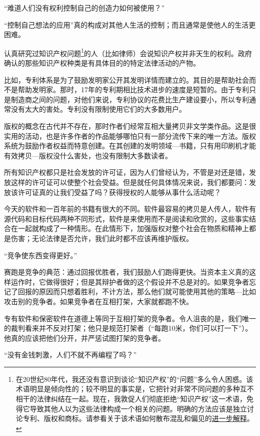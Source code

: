 “难道人们没有权利控制自己的创造力如何被使用？”\par
“控制自己想法的应用”真的构成对其他人生活的控制；而且通常是使他人的生活更困难。\par
认真研究过知识产权问题\footnote{在20世纪80年代，我还没有意识到谈论“知识产权”的“问题”多么令人困惑。该术语明显是倾向性的；较不明显的事实是，它把针对非常不同问题的多种互不相干的法律纠结在一起。现在，我敦促人们彻底拒绝“知识产权”这一术语，免得它导致其他人以为这些法律构成一个相关的问题。明确的方法应该是独立讨论专利、版权和商标。请参看关于该术语如何散布混乱和偏见的\href{http://www.gnu.org/philosophy/not-ipr.html}{进一步解释}。}的人（比如律师）会说知识产权并非天生的权利。政府确认的那些知识产权种类是有具体目的的特定法律活动的产物。\par
比如，专利体系是为了鼓励发明家公开其发明详情而建立的。其目的是帮助社会而不是帮助发明家。那时，17年的专利期相比技术进步的速度是短暂的。由于专利只是制造商之间的问题，对他们来说，专利协议的花费比生产建设要小，所以专利通常没有太大的害处。专利没有限制使用它们的大多数用户。\par
版权的概念在古代并不存在，那时作者们经常互相大量拷贝非文学类作品。这是很实用的活动，也是许多作者的作品能够哪怕只有一部分流传下来的唯一方法。版权系统为鼓励作者权益而特意创建。在其创建的发明领域—书籍，只有用印刷机才能有效拷贝—版权没什么害处，也没有限制大多数读者。\par
所有知识产权都只是社会发放的许可证，因为人们曾经认为，不管是对还是错，发放这样的许可证可以使整个社会受益。但是就任何具体情况来说，我们都要问：发放该许可证真的让我们受益了吗？获得授权的人能够从事什么活动呢？\par
今天的软件和一百年前的书籍有很大的不同。软件最容易的拷贝是人传人，软件有源代码和目标代码两种不同形式，软件是来使用而不是阅读和欣赏的，这些事实结合在一起就构成了一种情形。在此情形下，加强版权对整个社会在物质和精神上都是伤害；无论法律是否允许，我们此时都不应该再维护版权。\par
“竞争使东西变得更好。”\par
赛跑是竞争的典范：通过回报优胜者，我们鼓励人们跑得更快。当资本主义真的这样运作时，它做得很好；但是其辩护者做的这个假设并不总是对的。如果竞争者忘记了回报的原因而只想着胜利，不计方法，那么他们就可能使用其他的策略—比如攻击别的竞争者。如果竞争者在互相打架，大家就都跑不快。\par
专有软件和保密软件在道德上等同于互相打架的竞争者。令人沮丧的是，我们唯一的裁判看来并不反对打架；他只是规范打架者（“每跑10米，你们可以打一下”）。他真的应该把他们分开，并严惩试图打架的竞争者。\par
“没有金钱刺激，人们不就不再编程了吗？”\par
